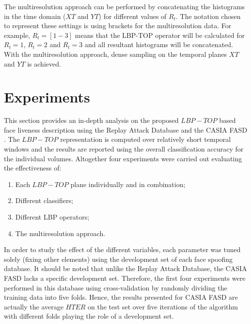 The multiresolution approach can be performed by concatenating the histograms in the time domain ($XT$ and $YT$) for different values of $R_t$. The notation chosen to represent these settings is using brackets for the multiresolution data. For example, $R_t=[1-3]$ means that the LBP-TOP operator will be calculated for $R_t=1$, $R_t=2$ and $R_t=3$ and all resultant histograms will be concatenated. With the multiresolution approach, dense sampling on the temporal planes $XT$ and $YT$ is achieved.


\section{Experiments}
\label{sec_experiments}

This section provides an in-depth analysis on the proposed $LBP-TOP$ based face liveness description using the Replay Attack Database \cite{ChingovskaBIOSIG2012} and the CASIA FASD \cite{zhangface}. The $LBP-TOP$ representation is computed over relatively short temporal windows and the results are reported using the overall classification accuracy for the individual volumes. Altogether four experiments were carried out evaluating the effectiveness of:

\begin{enumerate}
        \item Each $LBP-TOP$ plane individually and in combination;
        \item Different classifiers;
        \item Different LBP operators;
        \item The multiresolution approach.
\end{enumerate}

In order to study the effect of the different variables, each parameter was tuned solely (fixing other elements) using the development set of each face spoofing database. It should be noted that unlike the Replay Attack Database, the CASIA FASD lacks a specific development set. Therefore, the first four experiments were performed in this database using cross-validation by randomly dividing the training data into five folds. Hence, the results presented for CASIA FASD are actually the average $HTER$ on the test set over five iterations of the algorithm with different folds playing the role of a development set.

